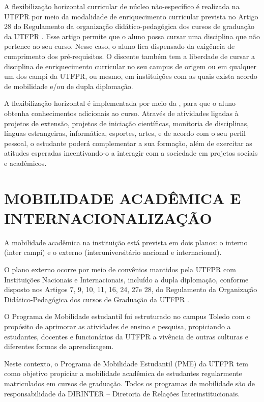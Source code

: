 A flexibilização horizontal curricular de núcleo não-específico é realizada na UTFPR por meio da modalidade de enriquecimento curricular prevista no Artigo 28 do Regulamento da organização didático-pedagógica dos cursos de graduação da UTFPR \cite{rodp}. Esse artigo permite que o aluno possa cursar uma disciplina que não pertence ao seu curso. Nesse caso, o aluno fica dispensado da exigência de cumprimento dos pré-requisitos. O discente também tem a liberdade de cursar a disciplina de enriquecimento curricular no seu campus de origem ou em qualquer um dos campi da UTFPR, ou mesmo, em instituições com as quais exista acordo de mobilidade e/ou de dupla diplomação.

A flexibilização horizontal é implementada por meio da , para que o aluno obtenha conhecimentos adicionais ao curso. Através de atividades ligadas à projetos de extensão, projetos de iniciação científicas, monitoria de disciplinas, línguas estrangeiras, informática, esportes, artes, e de acordo com o seu perfil pessoal, o estudante poderá complementar a sua formação, além de exercitar as atitudes esperadas incentivando-o a interagir com a sociedade em projetos sociais e acadêmicos.

\section{MOBILIDADE ACADÊMICA E INTERNACIONALIZAÇÃO}

A mobilidade acadêmica na instituição está prevista em dois planos: o interno (inter campi) e o externo (interuniversitário nacional e internacional).

O plano externo ocorre por meio de convênios mantidos pela UTFPR com Instituições Nacionais e Internacionais, incluído a dupla diplomação, conforme disposto nos Artigos 7\textordmasculine, 9\textordmasculine, 10\textordmasculine, 11\textordmasculine, 16\textordmasculine, 24\textordmasculine, 27\textordmasculine e 28\textordmasculine, do Regulamento da Organização Didático-Pedagógica dos cursos de Graduação da UTFPR \cite{rodp}.

O Programa de Mobilidade estudantil foi estruturado no campus Toledo com o propósito de aprimorar as atividades de ensino e pesquisa, propiciando a estudantes, docentes e funcionários da UTFPR a vivência de outras culturas e diferentes formas de aprendizagem.

Neste contexto, o Programa de Mobilidade Estudantil (PME) da UTFPR tem como objetivo propiciar a mobilidade acadêmica de estudantes regularmente matriculados em cursos de graduação. Todos os programas de mobilidade são de responsabilidade da DIRINTER – Diretoria de Relações Interinstitucionais.


